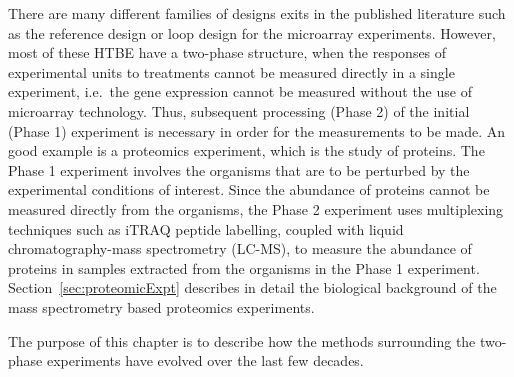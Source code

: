 \documentclass[11pt,a4paper]{article}
\begin{document}
There are many different families of designs exits in the published literature such as the reference design or loop design for the microarray experiments. However, most of these HTBE have a two-phase structure, when the responses of experimental units to treatments cannot be measured directly in a single experiment, i.e.\ the gene expression cannot be measured without the use of microarray technology. Thus, subsequent processing (Phase 2) of the initial (Phase 1) experiment is necessary in order for the measurements to be made. An good example is a proteomics experiment, which is the study of proteins. The Phase 1 experiment involves the organisms that are to be perturbed by the experimental conditions of interest. Since the abundance of proteins cannot be measured directly from the organisms, the Phase 2 experiment uses multiplexing techniques such as iTRAQ peptide labelling, coupled with liquid chromatography-mass spectrometry (LC-MS), to measure the abundance of proteins in samples extracted from the organisms in the Phase 1 experiment. Section~\ref{sec:proteomicExpt} describes in detail the biological background of the mass spectrometry based proteomics experiments. 

The purpose of this chapter is to describe how the methods surrounding the two-phase experiments have evolved over the last few decades. 

\end{document}
